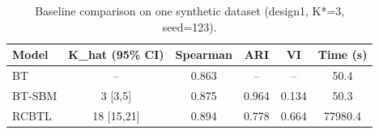\begin{table}[!h]
\centering
\caption{Baseline comparison on one synthetic dataset (design1, K*=3, seed=123).}
\centering
\begin{tabular}[t]{lccccc}
\toprule
Model & K\_hat (95\% CI) & Spearman & ARI & VI & Time (s)\\
\midrule
BT & -- & 0.863 & -- & -- & 50.4\\
BT-SBM & 3 [3,5] & 0.875 & 0.964 & 0.134 & 50.3\\
RCBTL & 18 [15,21] & 0.894 & 0.778 & 0.664 & 77980.4\\
\bottomrule
\end{tabular}
\end{table}